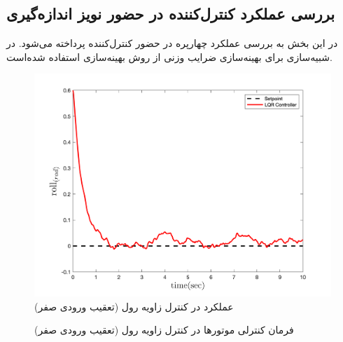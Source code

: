 \subsection{بررسی عملكرد کنترل‌کننده در حضور نويز اندازه‌گیری}\label{roll_noise}


 در این بخش به بررسی عملکرد چهارپره در حضور کنترل‌کننده  پرداخته می‌شود. در شبیه‌سازی برای بهینه‌سازی ضرایب وزنی  از روش بهینه‌سازی
 \cite{Karimi2010}
استفاده شده‌است.
\begin{figure}[H]
	\includegraphics[width=.48\linewidth]{../Figures/MIL/LQR/Roll/lqr_roll.png}
	\centering
	\caption{عملكرد  در کنترل زاويه رول (تعقیب ورودی صفر)}
	\label{lqr_roll_figure_simulation_n}
\end{figure}
\begin{figure}[H]
	\centering
	\caption{‫‪فرمان کنترلی موتورها در کنترل زاویه رول (تعقیب ورودی صفر)}
\end{figure}


